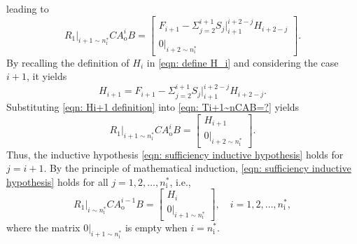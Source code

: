 \documentclass[sort&compress]{elsarticle}
\newcommand\Ao{A_\mathrm o}
\newcommand\nsharp{n_\mathrm i^*}
\begin{document}
leading to
\begin{equation}\label{eqn: Ti+1~nCAB=?}
R_1|_{i+1\sim\nsharp} C \Ao^i B
= \begin{bmatrix}
F_{i+1} - \Sigma_{j=2}^{i+1} S_j|^{i+2-j}_{i+1} H_{i+2-j} \\ 0|_{i+2\sim\nsharp}
\end{bmatrix}.
\end{equation}
By recalling the definition of $H_i$ in \eqref{eqn: define H_i} and considering the case $i+1$, it yields
\begin{equation}\label{eqn: Hi+1 definition}
H_{i+1} = F_{i+1} - \Sigma_{j=2}^{i+1} S_j|^{i+2-j}_{i+1} H_{i+2-j}.
\end{equation}
Substituting \eqref{eqn: Hi+1 definition} into \eqref{eqn: Ti+1~nCAB=?} yields
\begin{equation}\label{eqn:R1CAiB=Hi+1}
R_1|_{i+1\sim\nsharp} C \Ao^i B
= \begin{bmatrix}
H_{i+1} \\ 0|_{i+2\sim\nsharp}
\end{bmatrix}.
\end{equation}
Thus, the inductive hypothesis \eqref{eqn: sufficiency inductive hypothesis}
holds for $j = i+1$.
By the principle of mathematical induction, \eqref{eqn: sufficiency inductive hypothesis}
holds for all $j = 1, 2, \dots, \nsharp$, i.e.,
\begin{equation}\label{eqn:R1=Hi0}
R_1|_{i\sim\nsharp} C \Ao^{i-1} B
= \begin{bmatrix} H_i \\ 0|_{i+1\sim\nsharp} \end{bmatrix},
\quad i = 1, 2, \dots, \nsharp,
\end{equation}
where the matrix $0|_{i+1\sim\nsharp}$ is empty when $i = \nsharp$.
\end{document}
